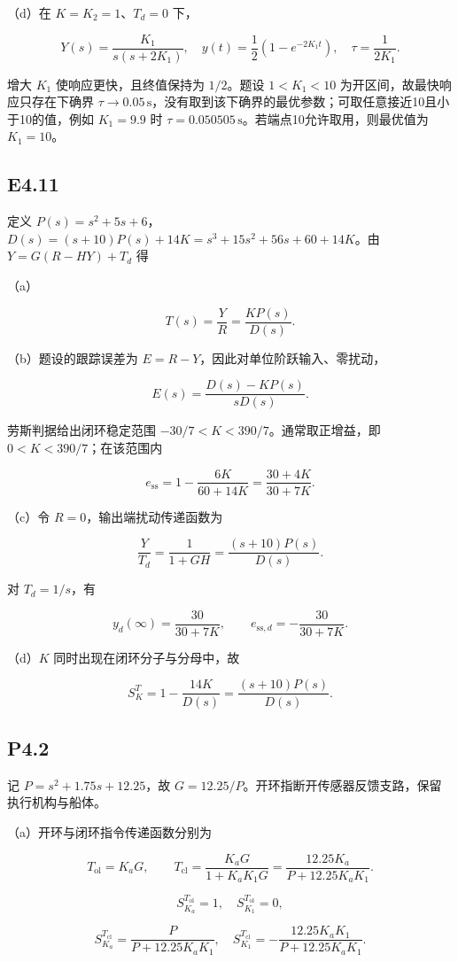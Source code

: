 \documentclass[UTF8,12pt]{ctexart}
\begin{document}
（d）在 $K=K_2=1$、$T_d=0$ 下，

\[
Y(s)=\frac{K_1}{s(s+2K_1)},\quad \boxed{y(t)=\frac12(1-e^{-2K_1t})},\quad \tau=\frac1{2K_1}.
\]

增大 $K_1$ 使响应更快，且终值保持为 $1/2$。题设 $1<K_1<10$ 为开区间，故最快响应只存在下确界 $\tau\to0.05\,\mathrm s$，没有取到该下确界的最优参数；可取任意接近10且小于10的值，例如 $K_1=9.9$ 时 $\tau=0.050505\,\mathrm s$。若端点10允许取用，则最优值为 $K_1=10$。


\subsection*{E4.11}
定义 $P(s)=s^2+5s+6$，$D(s)=(s+10)P(s)+14K=s^3+15s^2+56s+60+14K$。由 $Y=G(R-HY)+T_d$ 得

（a）

\[
\boxed{T(s)=\frac{Y}{R}=\frac{KP(s)}{D(s)}}.
\]

（b）题设的跟踪误差为 $E=R-Y$，因此对单位阶跃输入、零扰动，

\[
\boxed{E(s)=\frac{D(s)-KP(s)}{sD(s)}}.
\]

劳斯判据给出闭环稳定范围 $-30/7<K<390/7$。通常取正增益，即 $0<K<390/7$；在该范围内

\[
\boxed{e_{\mathrm{ss}}=1-\frac{6K}{60+14K}=\frac{30+4K}{30+7K}}.
\]

（c）令 $R=0$，输出端扰动传递函数为

\[
\boxed{\frac{Y}{T_d}=\frac1{1+GH}=\frac{(s+10)P(s)}{D(s)}}.
\]

对 $T_d=1/s$，有

\[
\boxed{y_d(\infty)=\frac{30}{30+7K},\qquad e_{\mathrm{ss},d}=-\frac{30}{30+7K}}.
\]

（d）$K$ 同时出现在闭环分子与分母中，故

\[
\boxed{S_K^T=1-\frac{14K}{D(s)}=\frac{(s+10)P(s)}{D(s)}}.
\]


\subsection*{P4.2}
记 $P=s^2+1.75s+12.25$，故 $G=12.25/P$。开环指断开传感器反馈支路，保留执行机构与船体。

（a）开环与闭环指令传递函数分别为

\[
T_{\mathrm{ol}}=K_aG,\qquad T_{\mathrm{cl}}=\frac{K_aG}{1+K_aK_1G}=\frac{12.25K_a}{P+12.25K_aK_1}.
\]

\[
\boxed{S_{K_a}^{T_{\mathrm{ol}}}=1,\quad S_{K_1}^{T_{\mathrm{ol}}}=0},
\]

\[
\boxed{S_{K_a}^{T_{\mathrm{cl}}}=\frac{P}{P+12.25K_aK_1},\quad S_{K_1}^{T_{\mathrm{cl}}}=-\frac{12.25K_aK_1}{P+12.25K_aK_1}}.
\]
\end{document}
